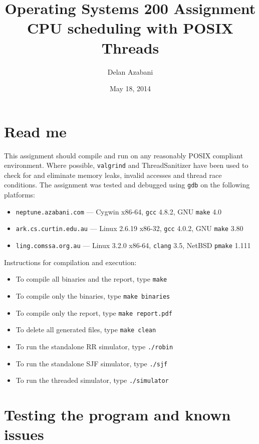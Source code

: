 \documentclass[a4paper,12pt,titlepage]{article}
\title{Operating Systems 200 Assignment\\
       CPU scheduling with POSIX Threads}
\date{May 18, 2014}
\author{Delan Azabani}
\begin{document}
\maketitle

\section{Read me}

This assignment should compile and run on any reasonably POSIX compliant
environment. Where possible, \texttt{valgrind} and ThreadSanitizer have been
used to check for and eliminate memory leaks, invalid accesses and thread race
conditions. The assignment was tested and debugged using \texttt{gdb} on the
following platforms:

\begin{itemize}
	\item \texttt{neptune.azabani.com} ---
	      Cygwin x86-64,
	      \texttt{gcc} 4.8.2,
	      GNU \texttt{make} 4.0
	\item \texttt{ark.cs.curtin.edu.au} ---
	      Linux 2.6.19 x86-32,
	      \texttt{gcc} 4.0.2,
	      GNU \texttt{make} 3.80
	\item \texttt{ling.comssa.org.au} ---
	      Linux 3.2.0 x86-64,
	      \texttt{clang} 3.5,
	      NetBSD \texttt{pmake} 1.111
\end{itemize}

Instructions for compilation and execution:

\begin{itemize}
	\item To compile all binaries and the report, type \texttt{make}
	\item To compile only the binaries, type \texttt{make binaries}
	\item To compile only the report, type \texttt{make report.pdf}
	\item To delete all generated files, type \texttt{make clean}
	\item To run the standalone RR simulator, type \texttt{./robin}
	\item To run the standalone SJF simulator, type \texttt{./sjf}
	\item To run the threaded simulator, type \texttt{./simulator}
\end{itemize}

\section{Testing the program and known issues}
\end{document}

